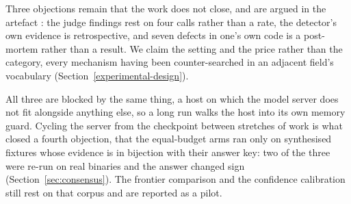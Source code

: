 Three objections remain that the work does not close, and are argued in the artefact
\citep{release2026artefact}: the judge findings rest on four calls rather than a rate, the
detector's own evidence is retrospective, and seven defects in one's own code is a post-mortem
rather than a result. We claim the setting and the price rather than the category, every mechanism
having been counter-searched in an adjacent field's vocabulary
(Section~\ref{experimental-design}).

All three are blocked by the same thing, a host on which the model server does not fit alongside
anything else, so a long run walks the host into its own memory guard. Cycling the server from the
checkpoint between stretches of work is what closed a fourth objection, that the equal-budget arms
ran only on  synthesised fixtures whose evidence is in bijection with their
answer key: two of the three were re-run on real binaries and the answer changed sign
(Section~\ref{sec:consensus}). The frontier comparison and the confidence calibration still rest on
that corpus and are reported as a pilot.
